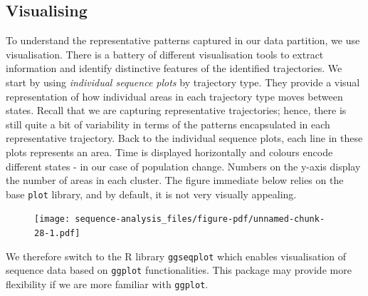 \documentclass[
  letterpaper,
  DIV=11,
  numbers=noendperiod]{scrreprt}
\newenvironment{Shaded}{\begin{snugshade}}{\end{snugshade}}
\newcommand{\AttributeTok}[1]{\textcolor[rgb]{0.40,0.45,0.13}{#1}}
\newcommand{\CommentTok}[1]{\textcolor[rgb]{0.37,0.37,0.37}{#1}}
\newcommand{\ConstantTok}[1]{\textcolor[rgb]{0.56,0.35,0.01}{#1}}
\newcommand{\DecValTok}[1]{\textcolor[rgb]{0.68,0.00,0.00}{#1}}
\newcommand{\FloatTok}[1]{\textcolor[rgb]{0.68,0.00,0.00}{#1}}
\newcommand{\FunctionTok}[1]{\textcolor[rgb]{0.28,0.35,0.67}{#1}}
\newcommand{\NormalTok}[1]{\textcolor[rgb]{0.00,0.23,0.31}{#1}}
\newcommand{\SpecialCharTok}[1]{\textcolor[rgb]{0.37,0.37,0.37}{#1}}
\newcommand{\StringTok}[1]{\textcolor[rgb]{0.13,0.47,0.30}{#1}}
\begin{document}
\hypertarget{visualising}{%
\subsection{Visualising}\label{visualising}}

To understand the representative patterns captured in our data
partition, we use visualisation. There is a battery of different
visualisation tools to extract information and identify distinctive
features of the identified trajectories. We start by using
\emph{individual sequence plots} by trajectory type. They provide a
visual representation of how individual areas in each trajectory type
moves between states. Recall that we are capturing representative
trajectories; hence, there is still quite a bit of variability in terms
of the patterns encapsulated in each representative trajectory. Back to
the individual sequence plots, each line in these plots represents an
area. Time is displayed horizontally and colours encode different states
- in our case of population change. Numbers on the y-axis display the
number of areas in each cluster. The figure immediate below relies on
the base \texttt{plot} library, and by default, it is not very visually
appealing.

\begin{Shaded}
\end{Shaded}

\begin{figure}[H]

{\centering \texttt{[image: sequence-analysis\_files/figure-pdf/unnamed-chunk-28-1.pdf]}

}

\end{figure}

We therefore switch to the R library \texttt{ggseqplot} which enables
visualisation of sequence data based on \texttt{ggplot} functionalities.
This package may provide more flexibility if we are more familiar with
\texttt{ggplot}.
\end{document}
